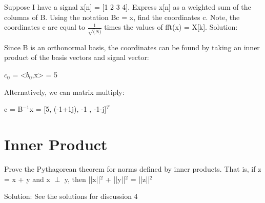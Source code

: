 \documentclass[11pt]{article}
\begin{document}
Suppose I have a signal x[n] = [1 2 3 4].  Express x[n] as a weighted sum of the columns of B. Using the notation Bc = x, find the coordinates c. Note, the coordinates c are equal to $\frac{1}{\sqrt(N)}$ times the values of fft(x) = X[k].
\newpage
\color{blue}
Solution:

Since B is an orthonormal basis, the coordinates can be found by taking an inner product of the basis vectors and signal vector:

\begin{center}

$c_0$ = <$b_0$,x> = 5

\end{center}

Alternatively, we can matrix multiply:

\begin{center}

c = B$^{-1}$x = [5, (-1+1j), -1 , -1-j]$^T$

\end{center}


\color{black}

\section{Inner Product}
Prove the Pythagorean theorem for norms defined by inner products. That is, if z = x + y and \newline
x $\perp$ y, then ||x||$^2$ + ||y||$^2$ = ||z||$^2$

\color{blue}
Solution: See the solutions for discussion 4
\end{document}

